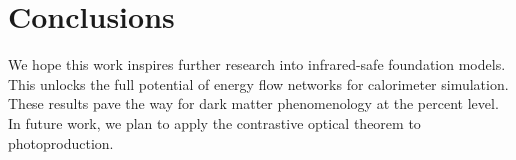 \section{Conclusions}\label{sec:conclusions}

We hope this work inspires further research into infrared-safe
foundation models. This unlocks the full potential of energy flow
networks for calorimeter simulation. These results pave the way for dark
matter phenomenology at the percent level. In future work, we plan to
apply the contrastive optical theorem to photoproduction.

